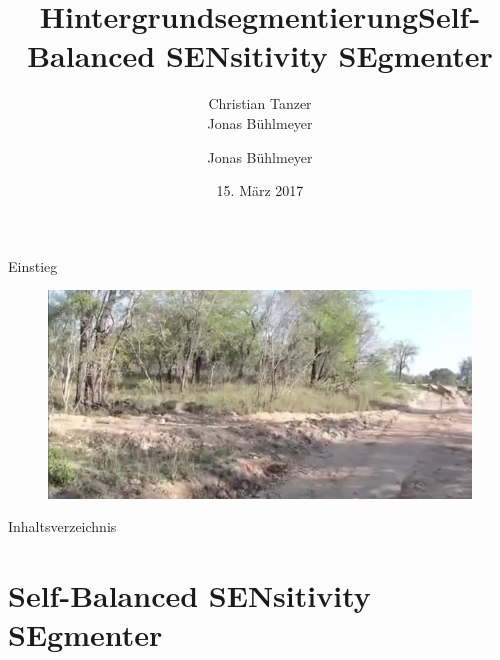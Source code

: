 \documentclass[hyperref={pdfpagelabels=false}]{beamer}
\title{Hintergrundsegmentierung}
\author{Christian Tanzer\\Jonas Bühlmeyer}
\date{15. März 2017}
\begin{document}
\begin{frame}
	\maketitle
\end{frame}


\begin{frame}[t]{Einstieg}
	\vspace{1.3em}
	\begin{figure}
		\centering
		\includegraphics[width=0.8\linewidth]{Abbildungen/Einstieg/original_small.jpg}
	\end{figure}
\end{frame}

\setcounter{framenumber}{0}

\begin{frame}[t]{Inhaltsverzeichnis}
	\tableofcontents[] 
\end{frame}

\title{Self-Balanced SENsitivity SEgmenter}   
\author{Jonas Bühlmeyer} 
\date{}

\section{Self-Balanced SENsitivity SEgmenter}

\begin{frame}
	\maketitle
\end{frame}
\end{document}
